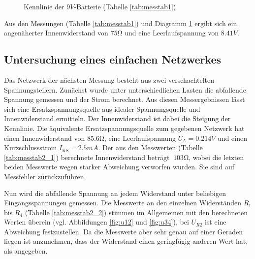 \documentclass[a4paper]{article}
\begin{document}
\begin{figure}
    \centering
    \caption{Kennlinie der $9\si{V}$-Batterie (Tabelle \ref{tab:messtab1})}
    \label{fig:messtab1_diagramm}
\end{figure}

Aus den Messungen (Tabelle \ref{tab:messtab1}) und Diagramm \ref{fig:messtab1_diagramm} ergibt sich ein angenäherter Innenwiderstand von $75\si{\ohm}$ und eine Leerlaufspannung von $8.41\si{V}$.

\FloatBarrier
\subsection{Untersuchung eines einfachen Netzwerkes}
Das Netzwerk der nächsten Messung besteht aus zwei verschachtelten Spannungsteilern. 
Zunächst wurde unter unterschiedlichen Lasten die abfallende Spannung gemessen und der Strom berechnet. Aus diesen Messergebnissen lässt sich eine Ersatzspannungsquelle aus idealer Spannungsquelle und Innenwiderstand ermitteln.
Der Innenwiderstand ist dabei die Steigung der Kennlinie.
Die äquivalente Ersatzspannungsquelle zum gegebenen Netzwerk hat einen Innenwiderstand von $85.6\si{\ohm}$, eine Leerlaufspannung $U_L=0.214\si{V}$ und einen Kurzschlussstrom  $I_{\text{KS}}=2.5\si{mA}$. Der aus den Messwerten (Tabelle \ref{tab:messtab2_1}) berechnete Innenwiderstand beträgt $~103\si{\ohm}$, wobei die letzten beiden Messwerte wegen starker Abweichung verworfen wurden. Sie sind auf Messfehler zurückzuführen.

Nun wird die abfallende Spannung an jedem Widerstand unter beliebigen Eingangsspannungen gemessen.
Die Messwerte an den einzelnen Widerständen $R_1$ bis $R_4$ (Tabelle \ref{tab:messtab2_2}) stimmen im Allgemeinen mit den berechneten Werten überein (vgl. Abbildungen \ref{fig:u12} und \ref{fig:u34}), bei $U_{R2}$ ist eine Abweichung festzustellen. Da die Messwerte aber sehr genau auf einer Geraden liegen ist anzunehmen, dass der Widerstand einen geringfügig anderen Wert hat, als angegeben.
\end{document}
